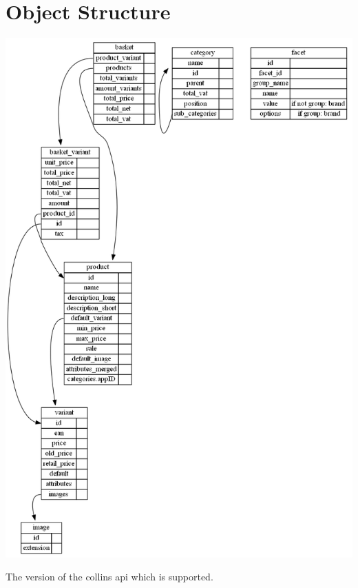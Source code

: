 \documentclass[letterpaper,10pt,english]{sphinxmanual}
\begin{document}
\section{Object Structure}
\label{collins:object-structure}
\includegraphics{collins_objects.png}

\begin{fulllineitems}
\label{collins:collins.COLLINS_VERSION}
The version of the collins api which is supported.

\end{fulllineitems}

\end{document}
